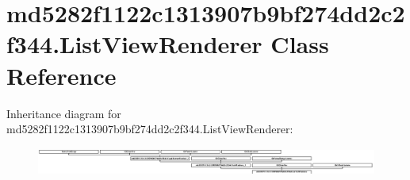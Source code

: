 \hypertarget{classmd5282f1122c1313907b9bf274dd2c2f344_1_1ListViewRenderer}{}\section{md5282f1122c1313907b9bf274dd2c2f344.\+List\+View\+Renderer Class Reference}
\label{classmd5282f1122c1313907b9bf274dd2c2f344_1_1ListViewRenderer}
Inheritance diagram for md5282f1122c1313907b9bf274dd2c2f344.\+List\+View\+Renderer\+:\begin{figure}[H]
\begin{center}
\leavevmode
\includegraphics[height=0.915033cm]{classmd5282f1122c1313907b9bf274dd2c2f344_1_1ListViewRenderer}
\end{center}
\end{figure}
